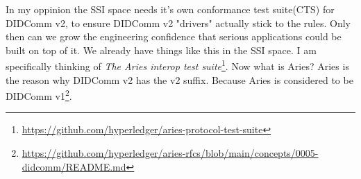 In my oppinion the SSI space needs it's own conformance test suite(CTS) for DIDComm v2, to ensure DIDComm v2 "drivers" actually stick to the rules. Only then can we grow the engineering confidence that serious applications could be built on top of it. We already have things like this in the SSI space. I am specifically thinking of \textit{The Aries interop test suite}\footnote{\url{https://github.com/hyperledger/aries-protocol-test-suite}}. Now what is Aries? Aries is the reason why DIDComm v2 has the v2 suffix. Because Aries is considered to be DIDComm v1\footnote{\url{https://github.com/hyperledger/aries-rfcs/blob/main/concepts/0005-didcomm/README.md}}.